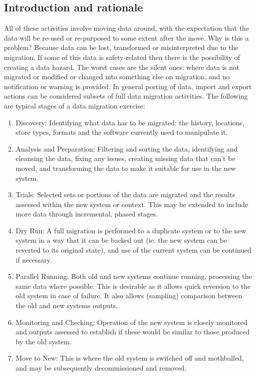 \subsection{Introduction and rationale}\label{bkm:migrationintro}
All of these activities involve moving data around, with the expectation that the data will be re-used or re-purposed to some extent after the move. Why is this a problem? Because data can be lost, transformed or misinterpreted due to the migration. If some of this data is safety-related then there is the possibility of creating a data hazard. The worst cases are the silent ones: where data is not migrated or modified or changed into something else on migration, and no notification or warning is provided.
In general porting of data, import and export actions can be considered subsets of full data migration activities. 
The following are typical stages of a data migration exercise:
\begin{enumerate}[label=\color{dsiwgAccentColour}\roman*)]
\item Discovery: Identifying what data has to be migrated:
the history, locations, store types, formats and the software currently used to manipulate it.
\item Analysis and Preparation:
Filtering and sorting the data, identifying and cleansing the data, fixing any issues, creating missing data that can’t be moved,
and transforming the data to make it suitable for use in the new system.
\item Trials:
Selected sets or portions of the data are migrated and the results assessed within the new system or context.
This may be extended to include more data through incremental, phased stages.
\item Dry Run:
A full migration is performed to a duplicate system or to the new system in a way that it can be backed out
(ie. the new system can be reverted to its original state), and use of the current system can be continued if necessary.
\item Parallel Running:
Both old and new systems continue running, processing the same data where possible.
This is desirable as it allows quick reversion to the old system in case of failure.
It also allows (sampling) comparison between the old and new systems outputs.
\item Monitoring and Checking:
Operation of the new system is closely monitored and outputs assessed to establish if these would be similar to those produced
by the old system.
\item Move to New:
This is where the old system is switched off and mothballed, and may be subsequently decommissioned and removed.
\end{enumerate}

